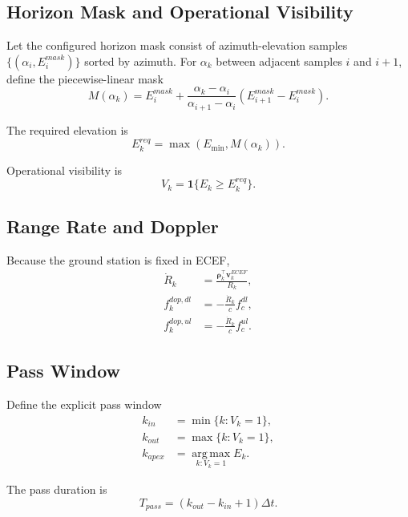\documentclass[11pt]{article}
\newcommand{\vect}[1]{\mathbf{#1}}
\newcommand{\argmax}{\operatorname*{arg\,max}}
\begin{document}
\subsection{Horizon Mask and Operational Visibility}

Let the configured horizon mask consist of azimuth-elevation samples
$\{(\alpha_i, E_i^{mask})\}$ sorted by azimuth.
For $\alpha_k$ between adjacent samples $i$ and $i+1$, define the piecewise-linear mask
\begin{equation}
  M(\alpha_k)
  =
  E_i^{mask}
  +
  \frac{\alpha_k - \alpha_i}{\alpha_{i+1} - \alpha_i}
  \left(E_{i+1}^{mask} - E_i^{mask}\right).
\end{equation}

The required elevation is
\begin{equation}
  E^{req}_k = \max(E_{\min}, M(\alpha_k)).
\end{equation}

Operational visibility is
\begin{equation}
  V_k = \mathbf{1}\{E_k \ge E^{req}_k\}.
\end{equation}

\subsection{Range Rate and Doppler}

Because the ground station is fixed in ECEF,
\begin{align}
  \dot{R}_k
  &= \frac{\vect{\rho}_k^\top \vect{v}^{ECEF}_k}{R_k}, \\
  f^{dop,dl}_k
  &= - \frac{\dot{R}_k}{c} f_c^{dl}, \\
  f^{dop,ul}_k
  &= - \frac{\dot{R}_k}{c} f_c^{ul}.
\end{align}

\subsection{Pass Window}

Define the explicit pass window
\begin{align}
  k_{in} &= \min\{k : V_k = 1\}, \\
  k_{out} &= \max\{k : V_k = 1\}, \\
  k_{apex} &= \argmax_{k:V_k=1} E_k.
\end{align}

The pass duration is
\begin{equation}
  T_{pass} = (k_{out} - k_{in} + 1)\Delta t.
\end{equation}
\end{document}

